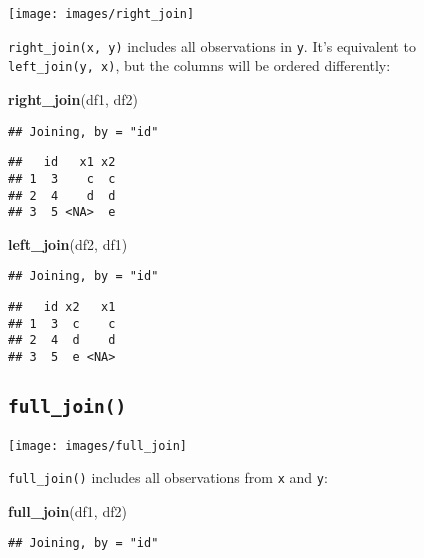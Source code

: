 \documentclass[]{book}
\newenvironment{Shaded}{\begin{snugshade}}{\end{snugshade}}
\newcommand{\KeywordTok}[1]{\textcolor[rgb]{0.13,0.29,0.53}{\textbf{{#1}}}}
\newcommand{\NormalTok}[1]{{#1}}
\begin{document}
\texttt{[image: images/right\_join]}

\texttt{right\_join(x,\ y)} includes all observations in \texttt{y}.
It's equivalent to \texttt{left\_join(y,\ x)}, but the columns will be
ordered differently:

\begin{Shaded}
\begin{Highlighting}[]
\KeywordTok{right_join}\NormalTok{(df1, df2)}
\end{Highlighting}
\end{Shaded}

\begin{verbatim}
## Joining, by = "id"
\end{verbatim}

\begin{verbatim}
##   id   x1 x2
## 1  3    c  c
## 2  4    d  d
## 3  5 <NA>  e
\end{verbatim}

\begin{Shaded}
\begin{Highlighting}[]
\KeywordTok{left_join}\NormalTok{(df2, df1)}
\end{Highlighting}
\end{Shaded}

\begin{verbatim}
## Joining, by = "id"
\end{verbatim}

\begin{verbatim}
##   id x2   x1
## 1  3  c    c
## 2  4  d    d
## 3  5  e <NA>
\end{verbatim}

\subsection{\texorpdfstring{\texttt{full\_join()}}{full\_join()}}\label{full_join}

\texttt{[image: images/full\_join]}

\texttt{full\_join()} includes all observations from \texttt{x} and
\texttt{y}:

\begin{Shaded}
\begin{Highlighting}[]
\KeywordTok{full_join}\NormalTok{(df1, df2)}
\end{Highlighting}
\end{Shaded}

\begin{verbatim}
## Joining, by = "id"
\end{verbatim}
\end{document}
